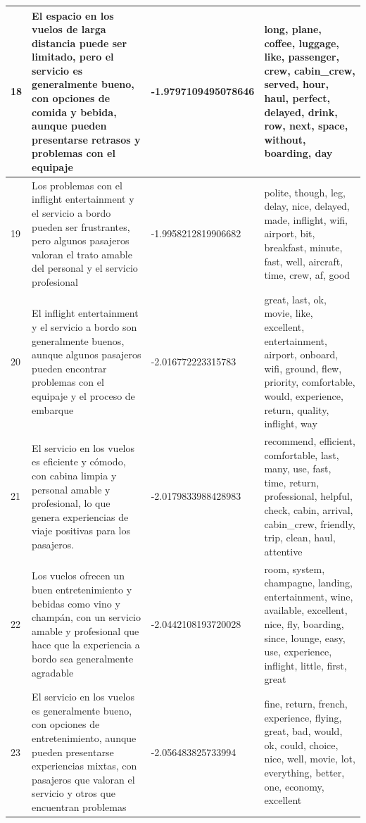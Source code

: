 \documentclass{report}
\begin{document}
{{\begin{longtable}{|p{1cm}|p{4cm}|p{4cm}|p{6cm}|}
                    \hline
                    18 & El espacio en los vuelos de larga distancia puede ser limitado, pero el servicio es generalmente bueno, con opciones de comida y bebida, aunque pueden presentarse retrasos y problemas con el equipaje & -1.9797109495078646 & long, plane, coffee, luggage, like, passenger, crew, cabin\_crew, served, hour, haul, perfect, delayed, drink, row, next, space, without, boarding, day \\
                    \hline
                    19 & Los problemas con el inflight entertainment y el servicio a bordo pueden ser frustrantes, pero algunos pasajeros valoran el trato amable del personal y el servicio profesional & -1.9958212819906682 & polite, though, leg, delay, nice, delayed, made, inflight, wifi, airport, bit, breakfast, minute, fast, well, aircraft, time, crew, af, good \\
                    \hline
                    20 & El inflight entertainment y el servicio a bordo son generalmente buenos, aunque algunos pasajeros pueden encontrar problemas con el equipaje y el proceso de embarque & -2.016772223315783 & great, last, ok, movie, like, excellent, entertainment, airport, onboard, wifi, ground, flew, priority, comfortable, would, experience, return, quality, inflight, way \\
                    \hline
                    21 & El servicio en los vuelos es eficiente y cómodo, con cabina limpia y personal amable y profesional, lo que genera experiencias de viaje positivas para los pasajeros. & -2.0179833988428983 & recommend, efficient, comfortable, last, many, use, fast, time, return, professional, helpful, check, cabin, arrival, cabin\_crew, friendly, trip, clean, haul, attentive \\
                    \hline
                    22 & Los vuelos ofrecen un buen entretenimiento y bebidas como vino y champán, con un servicio amable y profesional que hace que la experiencia a bordo sea generalmente agradable & -2.0442108193720028 & room, system, champagne, landing, entertainment, wine, available, excellent, nice, fly, boarding, since, lounge, easy, use, experience, inflight, little, first, great \\
                    \hline
                    23 & El servicio en los vuelos es generalmente bueno, con opciones de entretenimiento, aunque pueden presentarse experiencias mixtas, con pasajeros que valoran el servicio y otros que encuentran problemas & -2.056483825733994 & fine, return, french, experience, flying, great, bad, would, ok, could, choice, nice, well, movie, lot, everything, better, one, economy, excellent \\

\end{longtable}}}
\end{document}
